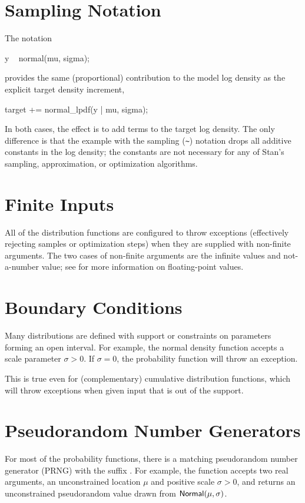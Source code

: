 \section{Sampling Notation}

The notation
%
\begin{stancode}
y ~ normal(mu, sigma);
\end{stancode}
%
provides the same (proportional) contribution to the model log density
as the explicit target density increment,
%
\begin{stancode}
target += normal_lpdf(y | mu, sigma);
\end{stancode}
%
In both cases, the effect is to add terms to the target log density.
The only difference is that the example with the sampling (\Verb|~|)
notation drops all additive constants in the log density;  the
constants are not necessary for any of Stan's sampling, approximation,
or optimization algorithms.

\section{Finite Inputs}

All of the distribution functions are configured to throw exceptions
(effectively rejecting samples or optimization steps) when they are
supplied with non-finite arguments.  The two cases of non-finite
arguments are the infinite values and not-a-number value;  see
 for more information on
floating-point values.


\section{Boundary Conditions}

Many distributions are defined with support or constraints on
parameters forming an open interval.  For example, the normal density
function accepts a scale parameter $\sigma > 0$.  If $\sigma = 0$, the
probability function will throw an exception.

This is true even for (complementary) cumulative distribution
functions, which will throw exceptions when given input that is out of
the support.

\section{Pseudorandom Number Generators}\label{distributions-prng.section}

For most of the probability functions, there is a matching
pseudorandom number generator (PRNG) with the suffix .
For example, the function  accepts two
real arguments, an unconstrained location $\mu$ and positive scale
$\sigma > 0$, and returns an unconstrained pseudorandom value drawn
from $\distro{Normal}(\mu,\sigma)$.

